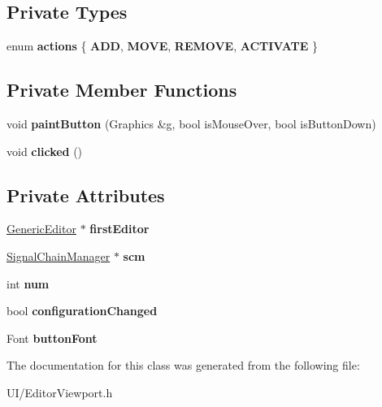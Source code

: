 \subsection*{Private Types}
\begin{DoxyCompactItemize}
\item 
enum {\bfseries actions} \{ {\bfseries A\-D\-D}, 
{\bfseries M\-O\-V\-E}, 
{\bfseries R\-E\-M\-O\-V\-E}, 
{\bfseries A\-C\-T\-I\-V\-A\-T\-E}
 \}
\end{DoxyCompactItemize}
\subsection*{Private Member Functions}
\begin{DoxyCompactItemize}
\item 
\hypertarget{classSignalChainTabButton_a22ce515c7e6f5593e9b8becea7bf2228}{void {\bfseries paint\-Button} (Graphics \&g, bool is\-Mouse\-Over, bool is\-Button\-Down)}\label{classSignalChainTabButton_a22ce515c7e6f5593e9b8becea7bf2228}

\item 
\hypertarget{classSignalChainTabButton_a7f4d77fb33b45457bae9b5f7e09d04e7}{void {\bfseries clicked} ()}\label{classSignalChainTabButton_a7f4d77fb33b45457bae9b5f7e09d04e7}

\end{DoxyCompactItemize}
\subsection*{Private Attributes}
\begin{DoxyCompactItemize}
\item 
\hypertarget{classSignalChainTabButton_afc50b5a3bd5a04c9a6551f8cbb8c017e}{\hyperlink{classGenericEditor}{Generic\-Editor} $\ast$ {\bfseries first\-Editor}}\label{classSignalChainTabButton_afc50b5a3bd5a04c9a6551f8cbb8c017e}

\item 
\hypertarget{classSignalChainTabButton_ae06686616b8f68e3194e3f6e7d9a134d}{\hyperlink{classSignalChainManager}{Signal\-Chain\-Manager} $\ast$ {\bfseries scm}}\label{classSignalChainTabButton_ae06686616b8f68e3194e3f6e7d9a134d}

\item 
\hypertarget{classSignalChainTabButton_aaf93a820d48a088fce328e71831c88b8}{int {\bfseries num}}\label{classSignalChainTabButton_aaf93a820d48a088fce328e71831c88b8}

\item 
\hypertarget{classSignalChainTabButton_a183bb733239fb3179fe00aecdc1c555f}{bool {\bfseries configuration\-Changed}}\label{classSignalChainTabButton_a183bb733239fb3179fe00aecdc1c555f}

\item 
\hypertarget{classSignalChainTabButton_a4ea8ef80ddbcdfa60a869a20f6136080}{Font {\bfseries button\-Font}}\label{classSignalChainTabButton_a4ea8ef80ddbcdfa60a869a20f6136080}

\end{DoxyCompactItemize}


The documentation for this class was generated from the following file\-:\begin{DoxyCompactItemize}
\item 
U\-I/Editor\-Viewport.\-h\end{DoxyCompactItemize}
